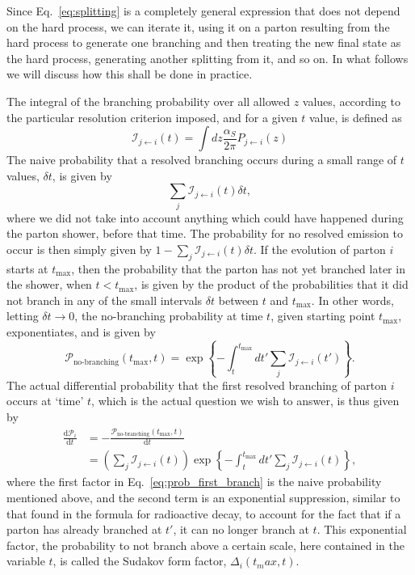 Since Eq.~\ref{eq:splitting} is a completely general expression that does not depend on the hard
process, we can iterate it, using it on a parton resulting from the hard process to generate
one branching and then treating the new final state as the hard process, generating another
splitting from it, and so on. In what follows we will discuss how this shall be done in practice.

The integral of the branching probability over all allowed $z$ values, according to the
particular resolution criterion imposed, and for a given $t$ value, is defined as
\begin{equation}
  \mathcal{I}_{j\leftarrow i}(t) = \int dz \frac{\alpha_S}{2\pi} P_{j\leftarrow i}(z)
\end{equation}
The naive probability that a resolved branching occurs during a small range of $t$ values, $\delta
t$, is given by 
\begin{equation}
 \sum_j \mathcal{I}_{j\leftarrow i}(t) \delta t,
\end{equation}
where we did not take into account anything which could have happened during the parton shower,
before that time. The probability for no resolved emission to occur is then simply given by $1 -
\sum_j \mathcal{I}_{j\leftarrow i}(t) \delta t$. 
If the evolution of parton $i$ starts at $t_{\text{max}}$, then the probability that the parton
has not yet branched later in the shower, when $t < t_{\text{max}}$, is given by
the product of the probabilities that it did not branch in any of the small intervals $\delta t$
between $t$ and $t_{\text{max}}$. In other words, letting $\delta t \rightarrow 0$, the no-branching
probability at time $t$, given starting point $t_{\text{max}}$, exponentiates, and is given by
\begin{equation}
  \mathcal{P}_{\text{no-branching}}(t_{\text{max}},t) = \exp 
  \left\{ - \int_t^{t_{\text{max}}} dt' \sum_j \mathcal{I}_{j\leftarrow i}(t') \right\} .
\end{equation}
The actual differential probability that the first resolved branching of parton $i$ occurs at `time'
$t$, which is the actual question we wish to answer, is thus given by
\begin{align}
  \frac{\text{d}\mathcal{P}_i}{\text{d}t} &= -
\frac{\mathcal{P}_{\text{no-branching}}(t_{\text{max}},t)}{\text{d}t} \\
 &= \left( \sum_j \mathcal{I}_{j\leftarrow i}(t)\right) \exp \left\{ - \int_t^{t_{\text{max}}} dt'
\sum_j \mathcal{I}_{j\leftarrow i}(t) \right\}, \label{eq:prob_first_branch}
\end{align}
where the first factor in Eq.~\ref{eq:prob_first_branch} is the naive probability mentioned above,
and the second term is an exponential suppression, similar to that found in the formula for
radioactive decay, to account for the fact that if a parton has already branched at $t'$, it can no
longer branch at $t$. 
This exponential factor, the probability to not branch above a certain scale, here
contained in the variable $t$, is called the Sudakov form factor, $\Delta_i(t_max,t)$. 

